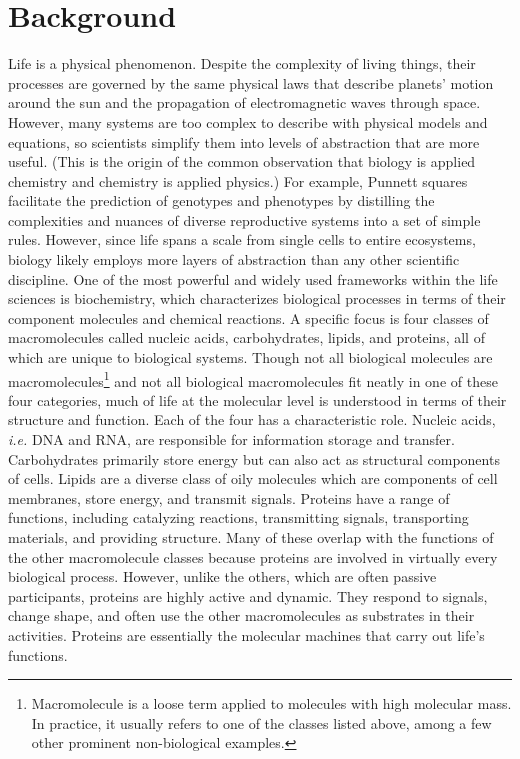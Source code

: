 \section{Background}
Life is a physical phenomenon. Despite the complexity of living things, their processes are governed by the same physical laws that describe planets' motion around the sun and the propagation of electromagnetic waves through space. However, many systems are too complex to describe with physical models and equations, so scientists simplify them into levels of abstraction that are more useful. (This is the origin of the common observation that biology is applied chemistry and chemistry is applied physics.) For example, Punnett squares facilitate the prediction of genotypes and phenotypes by distilling the complexities and nuances of diverse reproductive systems into a set of simple rules. However, since life spans a scale from single cells to entire ecosystems, biology likely employs more layers of abstraction than any other scientific discipline. One of the most powerful and widely used frameworks within the life sciences is biochemistry, which characterizes biological processes in terms of their component molecules and chemical reactions. A specific focus is four classes of macromolecules called nucleic acids, carbohydrates, lipids, and proteins, all of which are unique to biological systems. Though not all biological molecules are macromolecules\footnote{Macromolecule is a loose term applied to molecules with high molecular mass. In practice, it usually refers to one of the classes listed above, among a few other prominent non-biological examples.} and not all biological macromolecules fit neatly in one of these four categories, much of life at the molecular level is understood in terms of their structure and function. Each of the four has a characteristic role. Nucleic acids, \textit{i.e.} DNA and RNA, are responsible for information storage and transfer. Carbohydrates primarily store energy but can also act as structural components of cells. Lipids are a diverse class of oily molecules which are components of cell membranes, store energy, and transmit signals. Proteins have a range of functions, including catalyzing reactions, transmitting signals, transporting materials, and providing structure. Many of these overlap with the functions of the other macromolecule classes because proteins are involved in virtually every biological process. However, unlike the others, which are often passive participants, proteins are highly active and dynamic. They respond to signals, change shape, and often use the other macromolecules as substrates in their activities. Proteins are essentially the molecular machines that carry out life's functions.

